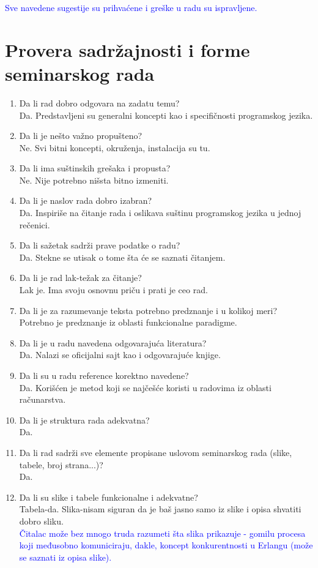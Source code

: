 \documentclass[a4paper]{report}
\newcommand{\odgovor}[1]{\textcolor{blue}{#1}}
\begin{document}
\odgovor{Sve navedene sugestije su prihvaćene i greške u radu su ispravljene.}


\section{Provera sadržajnosti i forme seminarskog rada}

\begin{enumerate}
\item Da li rad dobro odgovara na zadatu temu?\\Da. Predstavljeni su generalni koncepti kao i specifičnosti programskog jezika.
\item Da li je nešto važno propušteno?\\Ne. Svi bitni koncepti, okruženja, instalacija su tu.
\item Da li ima suštinskih grešaka i propusta?\\Ne. Nije potrebno nišsta bitno izmeniti.
\item Da li je naslov rada dobro izabran?\\Da. Inspiriše na čitanje rada i oslikava suštinu programskog jezika u jednoj rečenici.
\item Da li sažetak sadrži prave podatke o radu?\\ Da. Stekne se utisak o tome šta će se saznati čitanjem.
\item Da li je rad lak-težak za čitanje?\\Lak je. Ima svoju osnovnu priču i prati je ceo rad.
\item Da li je za razumevanje teksta potrebno predznanje i u kolikoj meri?\\Potrebno je predznanje iz oblasti funkcionalne paradigme.
\item Da li je u radu navedena odgovarajuća literatura?\\Da. Nalazi se oficijalni sajt kao i odgovarajuće knjige.
\item Da li su u radu reference korektno navedene?\\Da. Korišćen je metod koji se najčešće koristi u radovima iz oblasti računarstva.
\item Da li je struktura rada adekvatna?\\Da.
\item Da li rad sadrži sve elemente propisane uslovom seminarskog rada (slike, tabele, broj strana...)?\\Da.
\item Da li su slike i tabele funkcionalne i adekvatne?\\Tabela-da. Slika-nisam siguran da je baš jasno samo iz slike i opisa shvatiti dobro sliku.\\

\odgovor{Čitalac može bez mnogo truda razumeti šta slika prikazuje - gomilu procesa koji međusobno komuniciraju, dakle, koncept konkurentnosti u Erlangu (može se saznati iz opisa slike).}
\end{enumerate}
\end{document}
